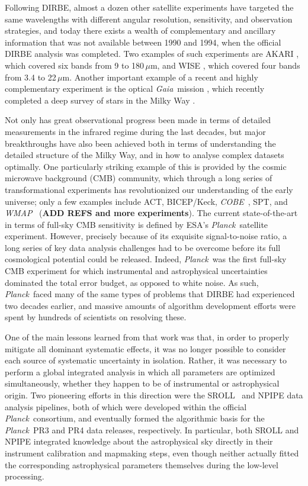 \documentclass{aa}
\def\Planck{\textit{Planck}}
\def\WMAP{\textit{WMAP}}
\def\COBE{\textit{COBE}}
\def\GAIA{\textit{Gaia}}
\begin{document}
Following DIRBE, almost a dozen other satellite experiments have targeted the same wavelengths with different angular resolution, sensitivity, and observation strategies, and today there exists a wealth of complementary and ancillary information that was not available between 1990 and 1994, when the official DIRBE analysis was completed. Two examples of such experiments are AKARI \citep{murakami:2007}, which covered six bands from 9 to 180\,$\mu$m, and WISE \citep{wright:2010}, which covered four bands from 3.4 to 22\,$\mu$m. Another important example of a recent and highly complementary experiment is the optical \GAIA\ mission \citep{gaia:2016}, which recently completed a deep survey of stars in the Milky Way \citep{gaia:2018}.

Not only has great observational progress been made in terms of detailed measurements in the infrared regime during the last decades, but major breakthroughs have also been achieved both in terms of understanding the detailed structure of the Milky Way, and in how to analyse complex datasets optimally. One particularly striking example of this is provided by the cosmic microwave background (CMB) community, which through a long series of transformational experiments has revolutionized our understanding of the early universe; only a few examples include ACT, BICEP/Keck, \COBE\ \citep{mather:1994}, SPT, and \WMAP\ \citep{bennett2012} ({\bf ADD REFS and more experiments}). The current state-of-the-art in terms of full-sky CMB sensitivity is defined by ESA's \Planck\ satellite experiment. However, precisely because of its exquisite signal-to-noise ratio, a long series of key data analysis challenges had to be overcome before its full cosmological potential could be released. Indeed, \Planck\ was the first full-sky CMB experiment for which instrumental and astrophysical uncertainties dominated the total error budget, as opposed to white noise. As such, \Planck\ faced many of the same types of problems that DIRBE had experienced two decades earlier, and massive amounts of algorithm development efforts were spent by hundreds of scientists on resolving these.

One of the main lessons learned from that work was that, in order to properly mitigate all dominant systematic effects, it was no longer possible to consider each source of systematic uncertainty in isolation. Rather, it was necessary to perform a global integrated analysis in which all parameters are optimized simultaneously, whether they happen to be of instrumental or astrophysical origin. Two pioneering efforts in this direction were the SROLL\ \citep{sroll2} and NPIPE \citep{npipe} data analysis pipelines, both of which were developed within the official \Planck\ consortium, and eventually formed the algorithmic basis for the \Planck\ PR3 \citep{planck2016-l01} and PR4 \citep{npipe} data releases, respectively. In particular, both SROLL and NPIPE integrated knowledge about the astrophysical sky directly in their instrument calibration and mapmaking steps, even though neither actually fitted the corresponding astrophysical parameters themselves  during the low-level processing.
\end{document}
